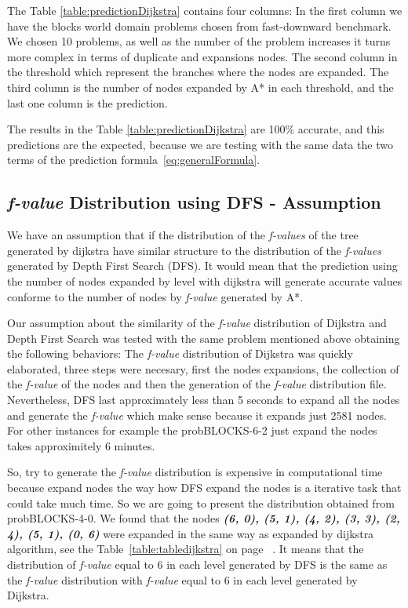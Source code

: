 \documentclass[11pt,a4paper,oneside]{report}
\begin{document}
The Table \ref{table:predictionDijkstra} contains four columns: In the first column we have the blocks world domain problems chosen from fast-downward benchmark. We chosen 10 problems, as well as the number of the problem increases it turns more complex in terms of duplicate and expansions nodes. The second column in the threshold which represent the branches where the nodes are expanded. The third column is the number of nodes expanded by A*  in each threshold, and the last one column is the prediction.\newline

The results in the Table \ref{table:predictionDijkstra} are 100\% accurate, and this predictions are the expected, because we are testing with the same data the two terms of the prediction formula~\eqref{eq:generalFormula}. 

\subsection{\textit{f-value} Distribution using DFS - Assumption }
We have an assumption that if the distribution of the \textit{f-values} of the tree generated by dijkstra have similar structure to the distribution of the \textit{f-values} generated by Depth First Search (DFS). It would mean that the prediction using the number of nodes expanded by level with dijkstra will generate accurate values conforme to the number of nodes by \textit{f-value} generated by A*.\newline

Our assumption about the similarity of the \textit{f-value} distribution of Dijkstra and Depth First Search was tested with the same problem mentioned above obtaining the following behaviors: The \textit{f-value} distribution of Dijkstra was quickly elaborated, three steps were necesary, first the nodes expansions, the collection of the \textit{f-value} of the nodes and then the generation of the \textit{f-value} distribution file. Nevertheless, DFS last approximately less than 5 seconds to expand all the nodes and generate the \textit{f-value} which make sense because it expands just 2581 nodes. For other instances for example the probBLOCKS-6-2 just expand the nodes takes approximitely 6 minutes.\newline

So, try to generate the \textit{f-value} distribution is expensive in computational time because expand nodes the way how DFS expand the nodes is a iterative task that could take much time. So we are going to present the distribution obtained from probBLOCKS-4-0. We found that the nodes \textbf{\textit{(6, 0), (5, 1), (4, 2), (3, 3), (2, 4), (5, 1), (0, 6)}} were expanded in the same way as expanded by dijkstra algorithm, see the Table~\ref{table:tabledijkstra}  on page ~\pageref{table:tabledijkstra}. It means that the distribution of \textit{f-value} equal to 6 in each level generated by DFS is the same as the \textit{f-value} distribution with \textit{f-value} equal to 6 in each level generated by Dijkstra.\newline
\end{document}
